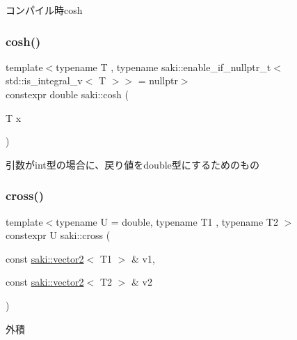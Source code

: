 コンパイル時cosh 

\mbox{\label{namespacesaki_afe248729248030bd5858469409e902d2}} 
\subsubsection{\texorpdfstring{cosh()}{cosh()}\hspace{0.1cm}{\footnotesize\ttfamily [2/2]}}
{\footnotesize\ttfamily template$<$typename T , typename saki\+::enable\+\_\+if\+\_\+nullptr\+\_\+t$<$ std\+::is\+\_\+integral\+\_\+v$<$ T $>$$>$  = nullptr$>$ \\
constexpr double saki\+::cosh (\begin{DoxyParamCaption}\item[{T}]{x }\end{DoxyParamCaption})}



引数がint型の場合に、戻り値をdouble型にするためのもの 

\mbox{\label{namespacesaki_a457d78ffe360e1d8a78d14ec5dab38f2}} 
\subsubsection{\texorpdfstring{cross()}{cross()}\hspace{0.1cm}{\footnotesize\ttfamily [1/2]}}
{\footnotesize\ttfamily template$<$typename U  = double, typename T1 , typename T2 $>$ \\
constexpr U saki\+::cross (\begin{DoxyParamCaption}\item[{const \mbox{\hyperlink{classsaki_1_1vector2}{saki\+::vector2}}$<$ T1 $>$ \&}]{v1,  }\item[{const \mbox{\hyperlink{classsaki_1_1vector2}{saki\+::vector2}}$<$ T2 $>$ \&}]{v2 }\end{DoxyParamCaption})}



外積 

\mbox{\label{namespacesaki_a980242869d69e47ff8b10335e86ccf6f}} 
